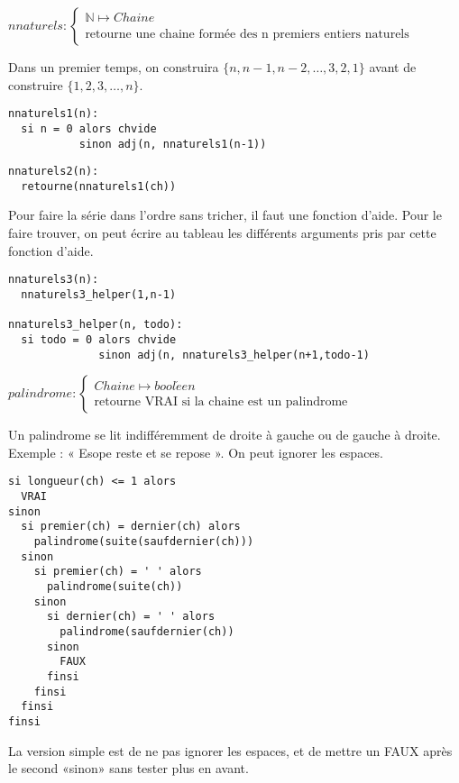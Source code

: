 \documentclass[10pt]{article}\usepackage[correction,nu]{esial}
\begin{document}
\begin{Question}
  $nnaturels: \left\{
    \begin{array}{l}
      \mathbb{N}\mapsto Chaine\\
      \text{retourne une chaine formée des n premiers entiers naturels}
    \end{array}\right.$  
  
  Dans un premier temps, on construira $\{n, n-1, n-2, \ldots, 3, 2, 1\}$ avant
  de construire $\{1, 2, 3, \ldots, n\}$.
\end{Question}
\begin{Reponse}
  \begin{Verbatim}[label=Version simple qui donne la liste à l'envers]
nnaturels1(n):
  si n = 0 alors chvide
           sinon adj(n, nnaturels1(n-1))
  \end{Verbatim}

  \begin{Verbatim}[label=Version trichée qui donne la chaine à l'endroit:]
nnaturels2(n):
  retourne(nnaturels1(ch))
  \end{Verbatim}
  
  Pour faire la série dans l'ordre sans tricher, il faut une fonction
  d'aide. Pour le faire trouver, on peut écrire au tableau les différents
  arguments pris par cette fonction d'aide.
  \begin{Verbatim}[label=Version avec helper:]
nnaturels3(n):
  nnaturels3_helper(1,n-1)    

nnaturels3_helper(n, todo):
  si todo = 0 alors chvide
              sinon adj(n, nnaturels3_helper(n+1,todo-1)
  \end{Verbatim}
\end{Reponse}


\begin{Question}
  $palindrome: \left\{
    \begin{array}{l}
      Chaine\mapsto bool\acute{e}en\\
      \text{retourne VRAI si la chaine est un palindrome}
    \end{array}\right.$  

  Un palindrome se lit indifféremment de droite à gauche ou de gauche à droite.
  Exemple : « Esope reste et se repose ». On peut ignorer les espaces.
\end{Question}
\begin{Reponse}
  \begin{Verbatim}[label=palindrome(ch)]
si longueur(ch) <= 1 alors 
  VRAI
sinon
  si premier(ch) = dernier(ch) alors
    palindrome(suite(saufdernier(ch)))
  sinon 
    si premier(ch) = ' ' alors
      palindrome(suite(ch))
    sinon 
      si dernier(ch) = ' ' alors
        palindrome(saufdernier(ch))
      sinon
        FAUX
      finsi
    finsi    
  finsi
finsi    
  \end{Verbatim}
  La version simple est de ne pas ignorer les espaces, et de
  mettre un FAUX après le second «sinon» sans tester plus en avant.
\end{Reponse}
\end{document}
